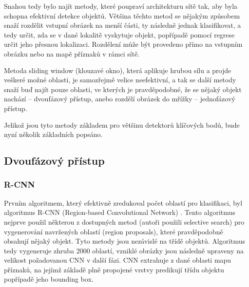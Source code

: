 Snahou tedy bylo najít metody, které poupraví architekturu sítě tak, aby byla
schopna efektivní detekce objektů. Většina těchto metod se nějakým způsobem
snaží rozdělit vstupní obrázek na menší části, ty následně jednak klasifikovat,
a tedy určit, zda se v dané lokalitě vyskytuje objekt, popřípadě pomocí regrese
určit jeho přesnou lokalizaci. Rozdělení může být provedeno přímo na vstupním
obrázku nebo na mapě příznaků v rámci sítě.

Metoda sliding window (klouzavé okno), která aplikuje hrubou sílu a projde
veškeré možné oblasti, je samozřejmě velice neefektivní, a tak se další metody
snaží buď najít pouze oblasti, ve kterých je pravděpodobné, že se nějaký objekt
nachází – dvoufázový přístup, anebo rozdělí obrázek do mřížky – jednofázový
přístup.

Jelikož jsou tyto metody základem pro většinu detektorů klíčových bodů, bude
nyní několik základních popsáno.





\subsection{Dvoufázový přístup}

\subsubsection*{R-CNN}
Prvním algoritmem, který efektivně zredukoval počet oblastí pro klasifikaci,
byl algoritmus R-CNN (Region-based Convolutional Network) \cite{r-cnn}. Tento
algoritmus nejprve použil některou z dostupných metod (autoři použili selective
search) pro vygenerování navržených oblastí (region proposals), které
pravděpodobně obsahují nějaký objekt. Tyto metody jsou nezávislé na třídě
objektů. Algoritmus tedy vygeneruje zhruba 2000 oblastí, vzniklé obrázky jsou
následně upraveny na velikost požadovanou CNN v další fázi. CNN extrahuje z
dané oblasti mapu příznaků, na jejímž základě plně propojené vrstvy predikují
třídu objektu popřípadě jeho bounding box.

